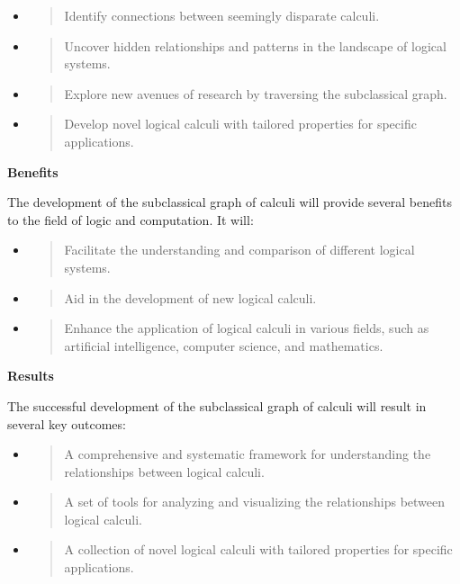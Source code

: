 \begin{itemize}
\item
  \begin{quote}
  Identify connections between seemingly disparate calculi.
  \end{quote}
\item
  \begin{quote}
  Uncover hidden relationships and patterns in the landscape of logical
  systems.
  \end{quote}
\item
  \begin{quote}
  Explore new avenues of research by traversing the subclassical graph.
  \end{quote}
\item
  \begin{quote}
  Develop novel logical calculi with tailored properties for specific
  applications.
  \end{quote}
\end{itemize}

\textbf{Benefits}

The development of the subclassical graph of calculi will provide
several benefits to the field of logic and computation. It will:

\begin{itemize}
\item
  \begin{quote}
  Facilitate the understanding and comparison of different logical
  systems.
  \end{quote}
\item
  \begin{quote}
  Aid in the development of new logical calculi.
  \end{quote}
\item
  \begin{quote}
  Enhance the application of logical calculi in various fields, such as
  artificial intelligence, computer science, and mathematics.
  \end{quote}
\end{itemize}

\textbf{Results}

The successful development of the subclassical graph of calculi will
result in several key outcomes:

\begin{itemize}
\item
  \begin{quote}
  A comprehensive and systematic framework for understanding the
  relationships between logical calculi.
  \end{quote}
\item
  \begin{quote}
  A set of tools for analyzing and visualizing the relationships between
  logical calculi.
  \end{quote}
\item
  \begin{quote}
  A collection of novel logical calculi with tailored properties for
  specific applications.
  \end{quote}
\end{itemize}


